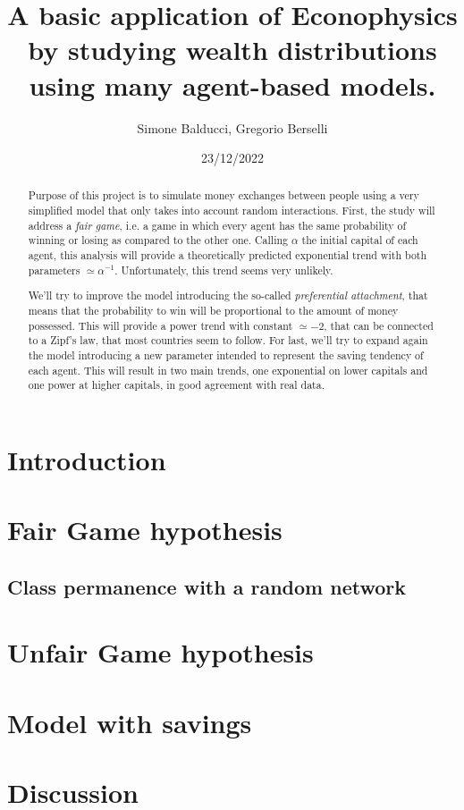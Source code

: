 \documentclass[12pt,a4paper]{article}
\title{A basic application of Econophysics by studying wealth distributions using many agent-based models.}
\author{Simone Balducci, Gregorio Berselli}
\date{23/12/2022}
\begin{document}
\maketitle

\begin{abstract}
    Purpose of this project is to simulate money exchanges between people using a very simplified model that only takes into account random interactions.
    First, the study will address a \emph{fair game}, i.e. a game in which every agent has the same probability of winning or losing as compared to the other one.
    Calling $\alpha$ the initial capital of each agent, this analysis will provide a theoretically predicted exponential trend with both parameters $\simeq \alpha^{-1}$. 
    Unfortunately, this trend seems very unlikely.

    We'll try to improve the model introducing the so-called \emph{preferential attachment}, that means that the probability to win will be proportional to the amount of money possessed.
    This will provide a power trend with constant $\simeq -2$, that can be connected to a Zipf's law, that most countries seem to follow.
    For last, we'll try to expand again the model introducing a new parameter intended to represent the saving tendency of each agent.
    This will result in two main trends, one exponential on lower capitals and one power at higher capitals, in good agreement with real data. 
\end{abstract}

\newpage
\thispagestyle{empty}
\addtocounter{page}{-2}
\mbox{}

\tableofcontents
\pagebreak

\section*{Introduction}

\pagebreak

\section{Fair Game hypothesis}


\subsection{Class permanence with a random network}

\pagebreak

\section{Unfair Game hypothesis}

\pagebreak

\section{Model with savings}

\pagebreak
\clearpage

\section{Discussion}


\newpage
\thispagestyle{empty}
\mbox{}

\printbibliography
\end{document}
